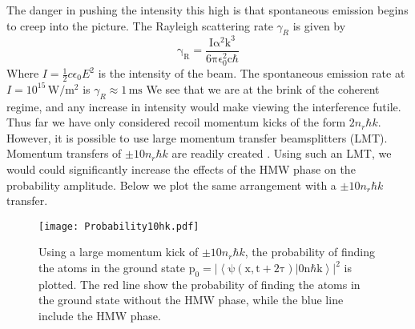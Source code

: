 \documentclass[twocolumn,english,pra,aps,superscriptaddress,floatfix]{revtex4-1}
\begin{document}
The danger in pushing the intensity this high is that spontaneous emission begins to creep into the picture. The Rayleigh scattering rate $\gamma_{R}$
is given by
\begin{equation}
\mathrm{\gamma_{R}=\frac{I\alpha ^2 k^3}{6 \pi\epsilon_{0}^2 c\hbar}}
\label{scatter}
\end{equation}
Where $I=\frac{1}{2}c\epsilon_0 E^2$ is the intensity of the beam. The spontaneous emission rate at $I=10^{15}\,\mathrm{W/m^2}$ is $\gamma_{R}\approx 1\,\mathrm{ms}$ We see that we are at the brink of the coherent regime, and any increase in intensity would make viewing the interference futile.  Thus far we have only considered recoil momentum kicks of the form $2n_r\hbar k$. However, it is possible to use large momentum transfer beamsplitters (LMT).  Momentum transfers of $\pm10 n_r\hbar k$ are readily created \cite{kasevich}.  Using such an LMT, we would could significantly increase the effects of the HMW phase on the probability amplitude.  Below we plot the same arrangement with a $\pm10 n_r\hbar k$ transfer.
\begin{figure}
\texttt{[image: Probability10hk.pdf]}
\caption{Using a large momentum kick of $\pm10 n_r\hbar k$, the probability of finding the atoms in the ground state $\mathrm{p_0=|\left<\psi(x,t+2\tau)|0n\hbar k\right>|^2}$ is plotted. The red line show the probability of finding the atoms in the ground state without the HMW phase, while the blue line include the HMW phase.} 
\label{fig:prob}
\end{figure}



 
\end{document}

